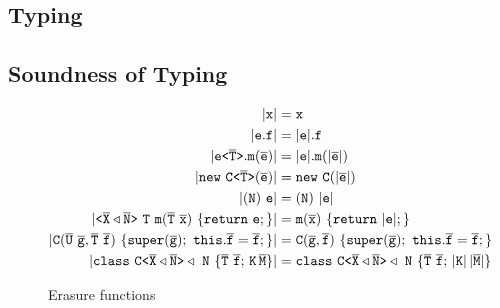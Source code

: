 
\subsection{Typing}
\label{chapter:type-rules}


\subsection{Soundness of Typing}
\label{sec:soundness-typing}
\begin{figure}[tp]
    \begin{align*}
      \Erase{\mv x} &= \mv x \\
      \Erase{\mv e.\mv f} &= \Erase{\mv e}.\mv f \\
      \Erase{\exptype{e}{\ol T}.\mathtt{m}(\ol{e})} &= \Erase{\mv e}. \mathtt{m} (\Erase{\ol e}) \\
      \Erase{\mathtt{new}\ \exptype{C}{\ol T}(\ol{e})} & = \mathtt{new}\ \mv{C}(\Erase{\ol{e}}) \\
      \Erase{(\mv N)\ \mv e} & = (\mv N)\ \Erase{\mv e} \\
      \Erase{\exptype{}{\ol{X} \triangleleft \ol{N}}\ \mv{T}\ \mathtt{m}(\ol T\ \ol{x})\ \{ \mathtt{
      return}\ \mv e; \}} & = \mathtt{m}(\ol{x})\ \{ \mathtt{ return}\ \Erase{\mv e}; \} \\
      \Erase{\mv C(\ol{U}\ \ol{g}, \ol{T}\ \ol{f})\ \{\mathtt{super}(\ol{g}); \ \mathtt{this}.\ol{f}=\ol{f};\}} & = \mv C(\ol{g}, \ol{f})\ \{\mathtt{super}(\ol{g}); \ \mathtt{this}.\ol{f}=\ol{f};\} \\
      \Erase{\mathtt{class} \ \exptype{C}{\ol{X} \triangleleft \ol{N}} \triangleleft \ \mv N\ \{ \ol{T} \ \ol{f}; \,\mv K \, \ol{M} \}} & = 
                                                                                                                                          \mathtt{class} \ \exptype{C}{\ol{X} \triangleleft \ol{N}} \triangleleft \ \mv N\ \{ \ol{T} \ \ol{f}; \,\Erase{\mv K} \, \Erase{\ol{M}} \}
    \end{align*}
    \caption{Erasure functions}
    \label{fig:erasure}
  \end{figure}

